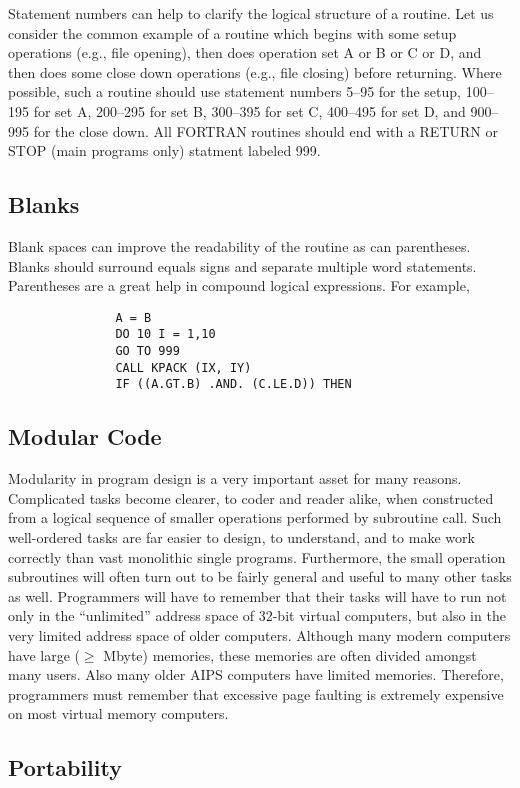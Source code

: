 Statement numbers can help to clarify the logical structure of a
routine.  Let us consider the common example of a routine which begins
with some setup operations (e.g., file opening), then does operation
set A or B or C or D, and then does some close down operations (e.g.,
file closing) before returning.  Where possible, such a routine should
use statement numbers 5--95 for the setup, 100--195 for set A, 200--295
for set B, 300--395 for set C, 400--495 for set D, and 900--995
for the close down.  All FORTRAN routines should end with a RETURN or
STOP (main programs only) statment labeled 999.


\subsection{Blanks}
Blank spaces can improve the readability of the routine as can
parentheses.  Blanks should surround equals signs and separate
multiple word statements.  Parentheses are a great help in compound
logical expressions.  For example,
\begin{verbatim}
               A = B
               DO 10 I = 1,10
               GO TO 999
               CALL KPACK (IX, IY)
               IF ((A.GT.B) .AND. (C.LE.D)) THEN
\end{verbatim}

\subsection{Modular Code}
Modularity  in program design is a very important asset for many
reasons.  Complicated tasks become clearer, to coder and reader alike,
when constructed from a logical sequence of smaller operations
performed by subroutine call.  Such well-ordered tasks are far easier
to design, to understand, and to make work correctly than vast
monolithic single programs.  Furthermore, the small operation
subroutines will often turn out to be fairly general and useful to
many other tasks as well.  Programmers will have to remember that
their tasks will have to run not only in the ``unlimited'' address space
of 32-bit virtual computers, but also in the very limited address
space of older computers. Although many modern computers have large
($\ge$ Mbyte) memories, these memories are often divided amongst many
users.  Also many older AIPS computers have limited memories.
Therefore, programmers must remember that excessive page faulting is
extremely expensive on most virtual memory computers.

\subsection{Portability}

